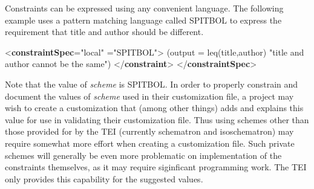 Constraints can be expressed using any convenient language. The following example uses a pattern matching language called SPITBOL to express the requirement that title and author should be different. \par\bgroup{}\exampleFont \begin{shaded}\noindent\mbox{}{<\textbf{constraintSpec}\hspace*{1em}{ident}="{local}"\mbox{}\newline 
\hspace*{1em}{scheme}="{SPITBOL}">}\mbox{}\newline 
{} (output = leq(title,author) "title and author cannot be the same") {</\textbf{constraint}>}\mbox{}\newline 
{</\textbf{constraintSpec}>}\end{shaded}\egroup\par \noindent  Note that the value of {\itshape scheme} is SPITBOL. In order to properly constrain and document the values of {\itshape scheme} used in their customization file, a project may wish to create a customization that (among other things) adds and explains this value for use in validating their customization file. Thus using schemes other than those provided for by the TEI (currently schematron and isoschematron) may require somewhat more effort when creating a customization file. Such private schemes will generally be even more problematic on implementation of the constraints themselves, as it may require siginficant programming work. The TEI only provides this capability for the suggested values.
